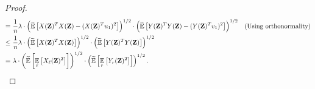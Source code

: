 \begin{proof}
\begin{align*}
    	=~ &\frac{1}{n} \lambda \cdot \inparen{ \tildeEx{ X(\zee)^T X(\zee) - (X(\zee)^T u_1)^2}}^{1/2} \cdot \inparen{ \tildeEx{ Y(\zee)^T Y(\zee) - (Y(\zee)^T v_1)^2}}^{1/2} && (\text{{Using orthonormality}})\\
    	\leq~ &\frac{1}{n} \lambda \cdot \inparen{ \tildeEx{ X(\zee)^T X(\zee)}}^{1/2} \cdot \inparen{ \tildeEx{ Y(\zee)^T Y(\zee)}}^{1/2} \\
    	 =~ & \lambda \cdot \inparen{ \tildeEx{\Ex{\li}{ X_{\li}(\zee)^2}}}^{1/2} \cdot \inparen{ \tildeEx{ \Ex{\ri}{Y_{\ri}(\zee)^2}}}^{1/2}. \qedhere
    \end{align*}
\end{proof}

